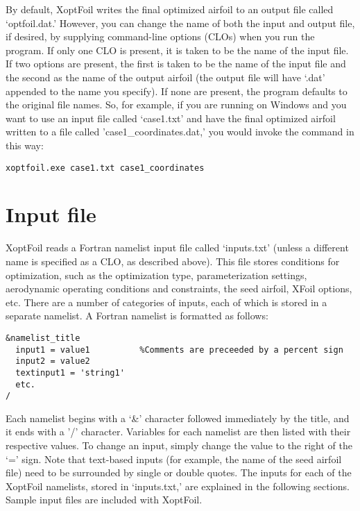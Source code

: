 \documentclass[11pt]{article}
\begin{document}
By default, XoptFoil writes the final optimized airfoil to an output file called
`optfoil.dat.'  However, you can change the name of both the input and output file, if
desired, by supplying command-line options (CLOs) when you run the program.  If only one 
CLO is present, it is
taken to be the name of the input file.  If two options are present, the first is taken to
be the name of the input file and the second as
the name of the output airfoil (the output file will have `.dat' appended to the name you
specify). If none are present, the program defaults to the
original file names.  So, for example, if you are running on Windows and you want to
use an input file called `case1.txt' and have the final optimized airfoil written to a
file called 'case1\_coordinates.dat,' you would invoke the command in this way:

\begin{verbatim}
xoptfoil.exe case1.txt case1_coordinates
\end{verbatim}

\section{Input file}

XoptFoil reads a Fortran namelist input file called `inputs.txt' (unless a different name
is specified as a CLO, as described above).  This file stores
conditions for optimization, such as the optimization type, parameterization settings,
aerodynamic operating conditions and constraints, the seed airfoil, XFoil options, etc.
There are a number of categories of inputs, each of which is stored in a separate
namelist.  A Fortran namelist is formatted as follows:

\begin{verbatim}
&namelist_title
  input1 = value1          %Comments are preceeded by a percent sign
  input2 = value2
  textinput1 = 'string1'
  etc.
/
\end{verbatim}

Each namelist begins with a `\&' character followed immediately by the title, and it ends with 
a '/' character.  Variables for each namelist are then listed with their respective
values.  To change an input, simply change the value to the right of the `=' sign.  Note
that text-based inputs (for example, the name of the seed airfoil file) need to be
surrounded by single or double quotes.  The inputs for each of the XoptFoil namelists,
stored in `inputs.txt,' are explained in the following sections. Sample input files are
included with XoptFoil.
\end{document}
